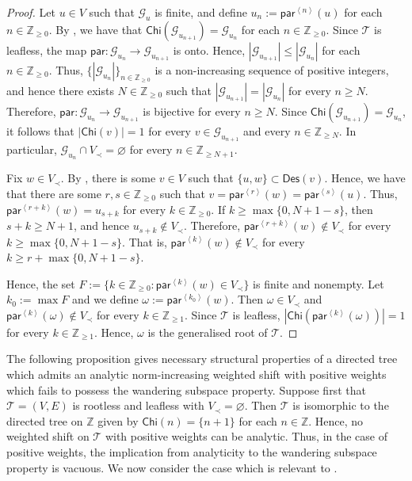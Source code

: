 \documentclass[11pt, reqno, a4paper]{amsart}
\theoremstyle{definition}
\newcommand{\scrG}{{\mathscr G}}
\newcommand{\scrT}{{\mathscr T}}
\newcommand{\ip}[1]{\left\langle #1 \right\rangle}
\newcommand{\abs}[1]{\left\lvert #1 \right\rvert}
\renewcommand{\le}{\leqslant}
\renewcommand{\ge}{\geqslant}
\newcommand{\Z}{\mathbb Z}
\newcommand{\Chi}{\mathsf{Chi}}
\newcommand{\pr}{\mathsf{par}}
\numberwithin{equation}{section}
\begin{document}
    \begin{proof}
        Let $u\in V$ such that $\scrG_u$ is finite, and define $u_n:=\pr^{\ip{n}}(u)$ for each $n\in\Z_{\ge 0}$. By \cite[Proposition 2.1.12(viii)]{MR2919910}, we have that $\Chi(\scrG_{u_{n+1}})=\scrG_{u_n}$ for each $n\in\Z_{\ge 0}$. Since $\scrT$ is leafless, the map $\pr:\scrG_{u_n}\to\scrG_{u_{n+1}}$ is onto. Hence, $\abs{\scrG_{u_{n+1}}}\le\abs{\scrG_{u_n}}$ for each $n\in\Z_{\ge 0}$. Thus, $\{\abs{\scrG_{u_n}}\}_{n\in\Z_{\ge 0}}$ is a non-increasing sequence of positive integers, and hence there exists $N\in\Z_{\ge 0}$ such that $\abs{\scrG_{u_{n+1}}}=\abs{\scrG_{u_n}}$ for every $n\ge N$. Therefore, $\pr:\scrG_{u_n}\to\scrG_{u_{n+1}}$ is bijective for every $n\ge N$. Since $\Chi(\scrG_{u_{n+1}})=\scrG_{u_n}$, it follows that $\abs{\Chi(v)}=1$ for every $v\in\scrG_{u_{n+1}}$ and every $n\in \Z_{\ge N}$. In particular, $\scrG_{u_n}\cap V_{\prec}=\varnothing$ for every $n\in \Z_{\ge N+1}$.
    
        Fix $w\in V_{\prec}$. By \cite[Proposition 2.1.4]{MR2919910}, there is some $v\in V$ such that $\{u,w\}\subset\mathsf{Des}(v)$. Hence, we have that there are some $r,s\in\Z_{\ge 0}$ such that $v=\pr^{\ip{r}}(w)=\pr^{\ip{s}}(u)$. Thus, $\pr^{\ip{r+k}}(w)=u_{s+k}$ for every $k\in\Z_{\ge 0}$. If $k\ge\max\{0,N+1-s\}$, then $s+k\ge N+1$, and hence $u_{s+k}\notin V_{\prec}$. Therefore, $\pr^{\ip{r+k}}(w)\notin V_{\prec}$ for every $k\ge\max\{0,N+1-s\}$. That is, $\pr^{\ip{k}}(w)\notin V_{\prec}$ for every $k\ge r+\max\{0,N+1-s\}$.
    
        Hence, the set $F:=\{k\in\Z_{\ge 0}:\pr^{\ip{k}}(w)\in V_{\prec}\}$ is finite and nonempty. Let $k_0:=\max F$ and we define $\omega:=\pr^{\ip{k_0}}(w)$. Then $\omega\in V_{\prec}$ and $\pr^{\ip{k}}(\omega)\notin V_{\prec}$ for every $k\in\Z_{\ge 1}$. Since $\scrT$ is leafless, $\abs{\Chi(\pr^{\ip{k}}(\omega))}=1$ for every $k\in\Z_{\ge 1}$. Hence, $\omega$ is the generalised root of $\scrT$.
    \end{proof}

    The following proposition gives necessary structural properties of a directed tree which admits an analytic norm-increasing weighted shift with positive weights which fails to possess the wandering subspace property. Suppose first that $\scrT=(V,E)$ is rootless and leafless with $V_{\prec}=\varnothing$. Then $\scrT$ is isomorphic to the directed tree on $\Z$ given by $\Chi(n)=\{n+1\}$ for each $n\in\Z$. Hence, no weighted shift on $\scrT$ with positive weights can be analytic. Thus, in the case of positive weights, the implication from analyticity to the wandering subspace property is vacuous. We now consider the case which is relevant to . 
\end{document}
